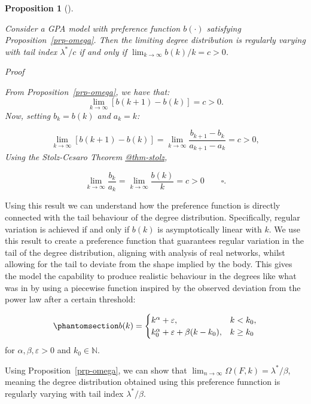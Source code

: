 \documentclass[
  sn-basic,
]{sn-jnl}
\theoremstyle{plain}
\newtheorem{proposition}{Proposition}[section]
\theoremstyle{plain}
\theoremstyle{remark}
\begin{document}
\begin{proposition}[]\protect\hypertarget{prp-omega2}{}\label{prp-omega2}

Consider a GPA model with preference function \(b(\cdot)\) satisfying
Proposition~\ref{prp-omega}. Then the limiting degree distribution is
regularly varying with tail index \(\lambda^{*}/c\) if and only if
\(\lim_{k\rightarrow\infty}b(k)/k = c > 0\).

\emph{Proof}

From Proposition~\ref{prp-omega}, we have that: \[
\lim_{k\rightarrow\infty}[b(k+1)-b(k)] = c>0.
\] Now, setting \(b_k = b(k)\) and \(a_k = k\):

\[
\lim_{k\rightarrow\infty}[b(k+1)-b(k)] = \lim_{k\rightarrow\infty}\frac{b_{k+1} - b_k}{a_{k+1} - a_k} = c>0,
\] Using the Stolz-Cesaro Theorem
\href{Appendix\%20-@sec-sup}{@thm-stolz},

\[
\lim_{k\rightarrow\infty}\frac{b_k}{a_k} = \lim_{k\rightarrow\infty}\frac{b(k)}{k} = c>0\qquad \square.
\]

\end{proposition}

Using this result we can understand how the preference function is
directly connected with the tail behaviour of the degree distribution.
Specifically, regular variation is achieved if and only if \(b(k)\) is
asymptotically linear with \(k\). We use this result to create a
preference function that guarantees regular variation in the tail of the
degree distribution, aligning with analysis of real networks, whilst
allowing for the tail to deviate from the shape implied by the body.
This gives the model the capability to produce realistic behaviour in
the degrees like what was in \citet{Lee24} by using a piecewise function
inspired by the observed deviation from the power law after a certain
threshold:

\begin{equation}\phantomsection\label{eq-pref}{
b(k) = \begin{cases}
k^\alpha + \varepsilon,&k<k_0,\\
k_0^\alpha + \varepsilon + \beta(k-k_0), &k\ge k_0
\end{cases}
}\end{equation} for \(\alpha,\beta, \varepsilon>0\) and
\(k_0\in\mathbb N\).

Using Proposition~\ref{prp-omega}, we can show that
\(\lim_{n\rightarrow\infty}\Omega(F,k)=\lambda^{*}/\beta\), meaning the
degree distribution obtained using this preference funnction is
regularly varying with tail index \(\lambda^*/\beta\).
\end{document}
